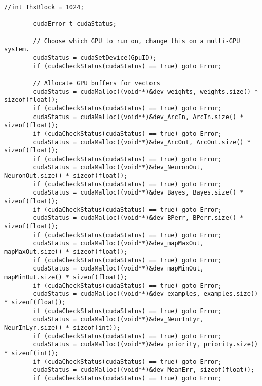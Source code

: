 \documentclass[10pt,a4paper]{article}
\begin{document}
\begin{lstlisting}[style=mycuda, caption=librerie usate, captionpos=b]
		//int ThxBlock = 1024;

		cudaError_t cudaStatus;

		// Choose which GPU to run on, change this on a multi-GPU system.
		cudaStatus = cudaSetDevice(GpuID);
		if (cudaCheckStatus(cudaStatus) == true) goto Error;

		// Allocate GPU buffers for vectors    
		cudaStatus = cudaMalloc((void**)&dev_weights, weights.size() * sizeof(float));
		if (cudaCheckStatus(cudaStatus) == true) goto Error;
		cudaStatus = cudaMalloc((void**)&dev_ArcIn, ArcIn.size() * sizeof(float));
		if (cudaCheckStatus(cudaStatus) == true) goto Error;
		cudaStatus = cudaMalloc((void**)&dev_ArcOut, ArcOut.size() * sizeof(float));
		if (cudaCheckStatus(cudaStatus) == true) goto Error;
		cudaStatus = cudaMalloc((void**)&dev_NeuronOut, NeuronOut.size() * sizeof(float));
		if (cudaCheckStatus(cudaStatus) == true) goto Error;
		cudaStatus = cudaMalloc((void**)&dev_Bayes, Bayes.size() * sizeof(float));
		if (cudaCheckStatus(cudaStatus) == true) goto Error;
		cudaStatus = cudaMalloc((void**)&dev_BPerr, BPerr.size() * sizeof(float));
		if (cudaCheckStatus(cudaStatus) == true) goto Error;
		cudaStatus = cudaMalloc((void**)&dev_mapMaxOut, mapMaxOut.size() * sizeof(float));
		if (cudaCheckStatus(cudaStatus) == true) goto Error;
		cudaStatus = cudaMalloc((void**)&dev_mapMinOut, mapMinOut.size() * sizeof(float));
		if (cudaCheckStatus(cudaStatus) == true) goto Error;
		cudaStatus = cudaMalloc((void**)&dev_examples, examples.size() * sizeof(float));
		if (cudaCheckStatus(cudaStatus) == true) goto Error;
		cudaStatus = cudaMalloc((void**)&dev_NeurInLyr, NeurInLyr.size() * sizeof(int));
		if (cudaCheckStatus(cudaStatus) == true) goto Error;
		cudaStatus = cudaMalloc((void**)&dev_priority, priority.size() * sizeof(int));
		if (cudaCheckStatus(cudaStatus) == true) goto Error;
		cudaStatus = cudaMalloc((void**)&dev_MeanErr, sizeof(float));
		if (cudaCheckStatus(cudaStatus) == true) goto Error;



\end{lstlisting}
\end{document}
